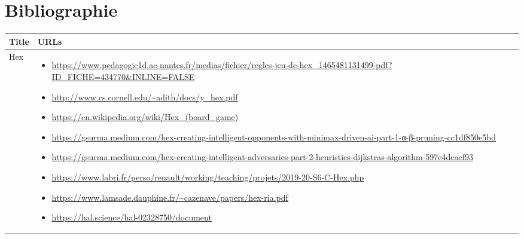 \section{Bibliographie}




\sloppy
\begin{tabular}{|l|p{}|}
    \hline
    \textbf{Title} & \textbf{URLs} \\
    \hline
    Hex & 
    \begin{itemize}
        \item \href{https://www.pedagogie1d.ac-nantes.fr/medias/fichier/regles-jeu-de-hex_1465481131499-pdf?ID_FICHE=434770&INLINE=FALSE}{\url{https://www.pedagogie1d.ac-nantes.fr/medias/fichier/regles-jeu-de-hex_1465481131499-pdf?ID_FICHE=434770&INLINE=FALSE}}
        \item \href{http://www.cs.cornell.edu/~adith/docs/y_hex.pdf}{\url{http://www.cs.cornell.edu/~adith/docs/y_hex.pdf}}
        \item \href{https://en.wikipedia.org/wiki/Hex_(board_game)}{\url{https://en.wikipedia.org/wiki/Hex_(board_game)}}
        \item \href{https://gsurma.medium.com/hex-creating-intelligent\allowbreak-opponents-with-minimax-driven-ai-part-1-α-β-pruning-cc1df850e5bd}{\url{https://gsurma.medium.com/hex-creating-intelligent-opponents-with-minimax-driven-ai-part-1-α-β-pruning-cc1df850e5bd}}
        \item \href{https://gsurma.medium.com/hex-creating-intelligent\allowbreak-adversaries-part-2-heuristics-dijkstras-algorithm-597e4dcacf93}{\url{https://gsurma.medium.com/hex-creating-intelligent-adversaries-part-2-heuristics-dijkstras-algorithm-597e4dcacf93}}
        \item \href{https://www.labri.fr/perso/renault/working/teaching/projets/2019-20-S6-C-Hex.php}{\url{https://www.labri.fr/perso/renault/working/teaching/projets/2019-20-S6-C-Hex.php}}
        \item \href{https://www.lamsade.dauphine.fr/~cazenave/papers/hex-ria.pdf}{\url{https://www.lamsade.dauphine.fr/~cazenave/papers/hex-ria.pdf}}
        \item \href{https://hal.science/hal-02328750/document}{\url{https://hal.science/hal-02328750/document}}

\end{itemize}
\end{tabular}
